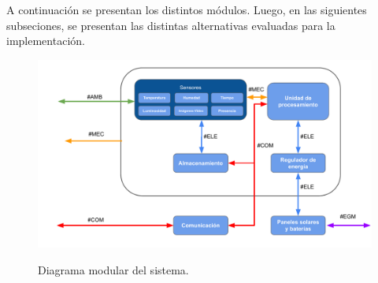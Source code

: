 




A continuación se presentan los distintos módulos. Luego, en las siguientes subseciones, se presentan las distintas alternativas evaluadas para la implementación.

\begin{figure}[H]
	\centering
	\includegraphics[width=0.9\linewidth]{ImagenesFactibilidad/EsquemaModular}
	\label{fig:esquema_modular}
	\caption{Diagrama modular del sistema.}
\end{figure}





%















